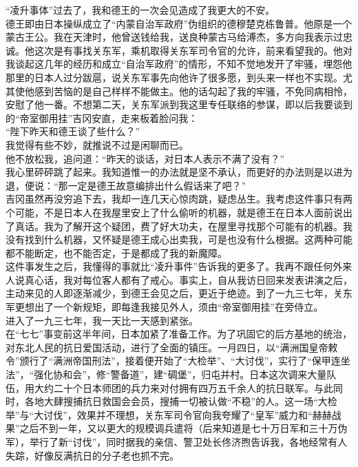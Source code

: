 “凌升事体”过去了，我和德王的一次会见造成了我更大的不安。\\

德王即由日本操纵成立了“内蒙自治军政府”伪组织的德穆楚克栋鲁普。他原是一个蒙古王公。我在天津时，他曾送钱给我，送良种蒙古马给溥杰，多方向我表示过忠诚。他这次是有事找关东军，乘机取得关东军司令官的允许，前来看望我的。他对我谈起这几年的经历和成立“自治军政府”的情形，不知不觉地发开了牢骚，埋怨他那里的日本人过分跋扈，说关东军事先向他许了很多愿，到头来一样也不实现。尤其使他感到苦恼的是自己样样不能做主。他的话勾起了我的牢骚，不免同病相怜，安慰了他一番。不想第二天，关东军派到我这里专任联络的参谋，即以后我要谈到的“帝室御用挂”吉冈安直，走来板着脸问我：\\

“陛下昨天和德王谈了些什么？”\\

我觉得有些不妙，就推说不过是闲聊而已。\\

他不放松我，追问道：“昨天的谈话，对日本人表示不满了没有？”\\

我心里砰砰跳了起来。我知道惟一的办法就是坚不承认，而更好的办法则是以进为退，便说：“那一定是德王故意编排出什么假话来了吧？”\\

吉冈虽然再没穷追下去，我却一连几天心惊肉跳，疑虑丛生。我考虑这件事只有两个可能，不是日本人在我屋里安上了什么偷听的机器，就是德王在日本人面前说出了真话。我为了解开这个疑团，费了好大功夫，在屋里寻找那个可能有的机器。我没有找到什么机器，又怀疑是德王成心出卖我，可是也没有什么根据。这两种可能都不能断定，也不能否定，于是都成了我的新魔障。\\

这件事发生之后，我懂得的事就比“凌升事件”告诉我的更多了。我再不跟任何外来人说真心话，我对每位客人都有了戒心。事实上，自从我访日回来发表讲演之后，主动来见的人即逐渐减少，到德王会见之后，更近于绝迹。到了一九三七年，关东军更想出了一个新规矩，即每逢我接见外人，须由“帝室御用挂”在旁侍立。\\

进入了一九三七年，我一天比一天感到紧张。\\

在“七七”事变前这半年间，日本加紧了准备工作。为了巩固它的后方基地的统治，对东北人民的抗日爱国活动，进行了全面的镇压。一月四日，以“满洲国皇帝敕令”颁行了“满洲帝国刑法”，接着便开始了“大检举”、“大讨伐”，实行了“保甲连坐法”，“强化协和会”，修“警备道”，建“碉堡”，归屯并村。日本这次调来大量队伍，用大约二十个日本师团的兵力来对付拥有四万五千余人的抗日联军。与此同时，各地大肆搜捕抗日救国会会员，搜捕一切被认做“不稳”的人。这一场“大检举”与“大讨伐”，效果并不理想，关东军司令官向我夸耀了“皇军”威力和“赫赫战果”之后不到一年，又以更大的规模调兵遣将（后来知道是七十万日军和三十万伪军），举行了新“讨伐”，同时据我的亲信、警卫处长佟济煦告诉我，各地经常有人失踪，好像反满抗日的分子老也抓不完。\\

